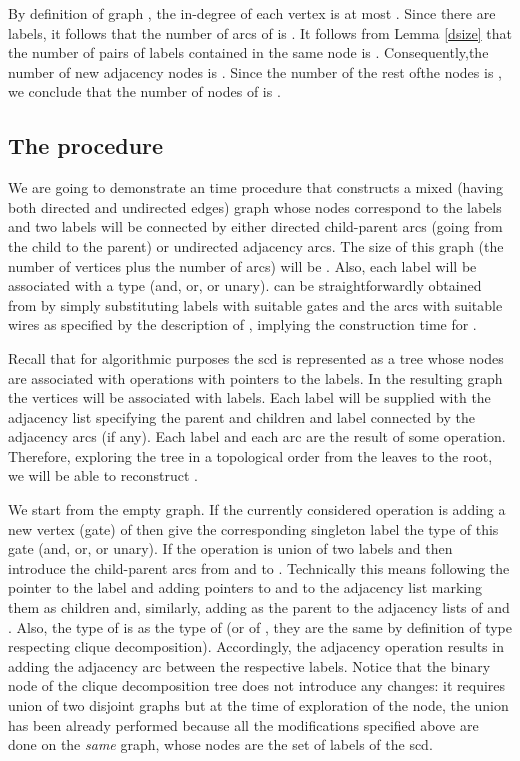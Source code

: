 \documentclass{llncs}
\begin{document}
By definition of graph , the in-degree of each vertex is at most .
Since there are  labels, it follows that the number of arcs of 
is . It follows from Lemma \ref{dsize} that the number of pairs of
labels contained in the same node is . Consequently,the number of
new adjacency nodes is . Since the number of the rest ofthe nodes
is , we conclude that the number of nodes of  is .

\subsection{The procedure}
We are going to demonstrate an  time procedure that constructs a mixed (having both directed and undirected
edges) graph  whose nodes correspond to the labels and two labels will be connected by either directed child-parent arcs
(going from the child to the parent) or undirected adjacency arcs. The size of this graph (the number of vertices plus the number of arcs)
will be . Also, each label will be associated with a type ({\sc and}, {\sc or}, or unary).  can be straightforwardly obtained from 
by simply substituting labels with suitable gates and the arcs with suitable wires as specified by the description of , implying
the  construction time for .

Recall that for algorithmic purposes the {\sc scd} is represented as a tree whose nodes are associated with operations
with pointers to the labels. In the resulting graph the vertices will be associated with labels. Each label will be supplied
with the adjacency list specifying the parent and children and label connected by the adjacency arcs (if any).
Each label and each arc are the result of some operation. Therefore, exploring the tree in a topological
order from the leaves to the root, we will be able to reconstruct . 

We start from the empty graph. If the currently considered
operation is adding a new vertex (gate) of  then 
give the corresponding singleton label the type of this gate ({\sc and}, {\sc or}, or unary). If the operation is union of two 
labels  and  then introduce the child-parent arcs from  and  to . 
Technically this means following the pointer to the label  and adding pointers to  and 
to the adjacency list marking them as children and, similarly, adding  as the parent to the 
adjacency lists of  and . Also, the type of  is as the type of  (or of , they are the same by definition
of type respecting clique decomposition). Accordingly, the adjacency operation results in adding the adjacency arc between 
the respective labels. Notice that the binary node of the clique decomposition tree does not introduce any changes: it requires union
of two disjoint graphs but at the time of exploration of the node, the union has been already performed because all the modifications
specified above are done on the \emph{same} graph, whose nodes are the set of labels of the {\sc scd}.
\end{document}

